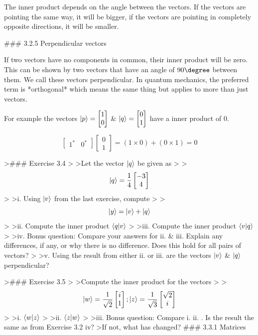 \documentclass{book}
\begin{document}
The inner product depends on the angle between the vectors. If the vectors are pointing the same way, it will be bigger, if the vectors are pointing in completely opposite directions, it will be smaller. 

### 3.2.5 Perpendicular vectors 

If two vectors have no components in common, their inner product will be zero. This can be shown by two vectors that have an angle of $90\degree$ between them.  We call these vectors perpendicular. In quantum mechanics, the preferred term is *orthogonal* which means the same thing but applies to more than just vectors. 

For example the vectors $\ket{p} = \begin{bmatrix} 1 \\ 0 \end{bmatrix}$ & $\ket{q} = \begin{bmatrix} 0 \\ 1 \end{bmatrix}$ have a inner product  of 0. 

$$ \begin{bmatrix} 1^* & 0^* \end{bmatrix}  \begin{bmatrix} 0 \\ 1 \end{bmatrix} = (1 \times 0) + (0 \times 1) = 0$$



>### Exercise 3.4 
>
>Let the vector $\ket{q}$ be given as 
>
>$$ \ket{q} = \frac{1}{4} \begin{bmatrix} -3 \\ 4 \end{bmatrix} $$
>
>i. Using $\ket{v}$ from the last exercise, compute 
>
>$$ \ket{y} = \ket{v} + \ket{q} $$
>
>ii. Compute the inner product $ \braket{q | v} $
>
>iii. Compute the inner product $ \braket{v | q} $ 
>
>iv. Bonus question: Compare your answers for ii. & iii. Explain any differences, if any, or why there is no difference. Does this hold for all pairs of vectors?
>
>v. Using the result from either ii. or iii. are the vectors $\ket{v}$ & $\ket{q}$ perpendicular?


>### Exercise 3.5
>
>Compute the inner product for the vectors 
>
>$$ \ket{w} = \frac{1}{\sqrt{2}} \begin{bmatrix} i \\ 1 \end{bmatrix} ; \ket{z} = \frac{1}{\sqrt{3}} \begin{bmatrix} \sqrt{2} \\ i \end{bmatrix}$$
>
>i. $\braket{w|z}$
>
>ii. $\braket{z|w}$
>
>iii. Bonus question: Compare i. ii. . Is the result the same as from Exercise 3.2 iv? 
>If not, what has changed?
### 3.3.1 Matrices
\end{document}
